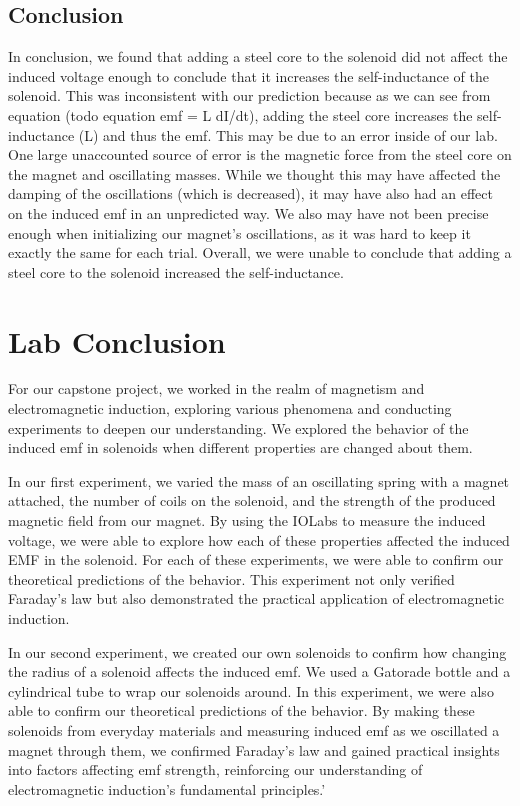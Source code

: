 \documentclass[11pt]{article}
\let\oldsection\section
\renewcommand\section{\clearpage\oldsection}
\begin{document}
    \subsection{Conclusion}\label{subsec:part_3_conclusion}
    In conclusion, we found that adding a steel core to the solenoid did not affect the induced voltage enough to conclude that it increases the self-inductance of the solenoid. This was inconsistent with our prediction because as we can see from equation (todo equation emf = L dI/dt), adding the steel core increases the self-inductance (L) and thus the emf. This may be due to an error inside of our lab. One large unaccounted source of error is the magnetic force from the steel core on the magnet and oscillating masses. While we thought this may have affected the damping of the oscillations (which is decreased), it may have also had an effect on the induced emf in an unpredicted way. We also may have not been precise enough when initializing our magnet's oscillations, as it was hard to keep it exactly the same for each trial. Overall, we were unable to conclude that adding a steel core to the solenoid increased the self-inductance.
    

    \section{Lab Conclusion}\label{sec:lab_conclusion}
    For our capstone project, we worked in the realm of magnetism and electromagnetic induction, exploring various phenomena and conducting experiments to deepen our understanding. We explored the behavior of the induced emf in solenoids when different properties are changed about them.

    In our first experiment, we varied the mass of an oscillating spring with a magnet attached, the number of coils on the solenoid, and the strength of the produced magnetic field from our magnet. By using the IOLabs to measure the induced voltage, we were able to explore how each of these properties affected the induced EMF in the solenoid. For each of these experiments, we were able to confirm our theoretical predictions of the behavior. This experiment not only verified Faraday’s law but also demonstrated the practical application of electromagnetic induction.

    In our second experiment, we created our own solenoids to confirm how changing the radius of a solenoid affects the induced emf. We used a Gatorade bottle and a cylindrical tube to wrap our solenoids around. In this experiment, we were also able to confirm our theoretical predictions of the behavior. By making these solenoids from everyday materials and measuring induced emf as we oscillated a magnet through them, we confirmed Faraday's law and gained practical insights into factors affecting emf strength, reinforcing our understanding of electromagnetic induction's fundamental principles.'
\end{document}
